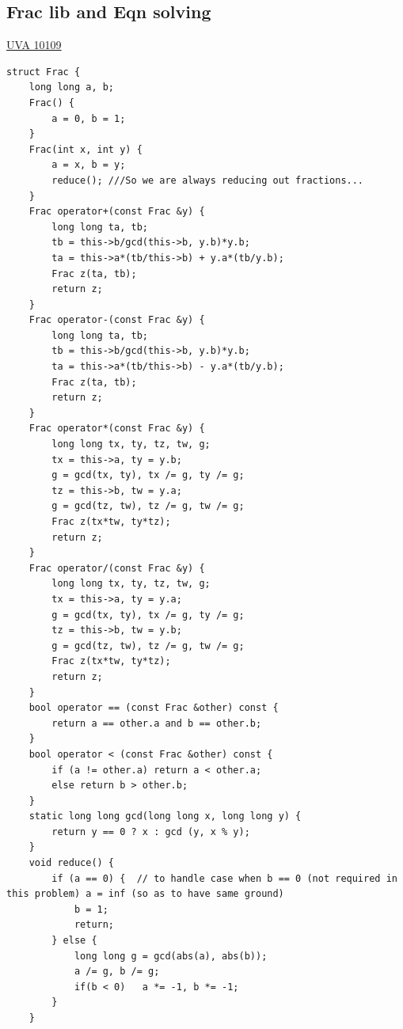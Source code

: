 \documentclass[8pt, a4paper, oneside, twocolumn]{extarticle}
\begin{document}
\subsection{Frac lib and Eqn solving}
\href{https://uva.onlinejudge.org/external/101/10109.pdf}{UVA 10109}
\begin{verbatim}
struct Frac {
    long long a, b;
    Frac() {
        a = 0, b = 1;
    }
    Frac(int x, int y) {
        a = x, b = y;
        reduce(); ///So we are always reducing out fractions...
    }
    Frac operator+(const Frac &y) {
        long long ta, tb;
        tb = this->b/gcd(this->b, y.b)*y.b;
        ta = this->a*(tb/this->b) + y.a*(tb/y.b);
        Frac z(ta, tb);
        return z;
    }
    Frac operator-(const Frac &y) {
        long long ta, tb;
        tb = this->b/gcd(this->b, y.b)*y.b;
        ta = this->a*(tb/this->b) - y.a*(tb/y.b);
        Frac z(ta, tb);
        return z;
    }
    Frac operator*(const Frac &y) {
        long long tx, ty, tz, tw, g;
        tx = this->a, ty = y.b;
        g = gcd(tx, ty), tx /= g, ty /= g;
        tz = this->b, tw = y.a;
        g = gcd(tz, tw), tz /= g, tw /= g;
        Frac z(tx*tw, ty*tz);
        return z;
    }
    Frac operator/(const Frac &y) {
        long long tx, ty, tz, tw, g;
        tx = this->a, ty = y.a;
        g = gcd(tx, ty), tx /= g, ty /= g;
        tz = this->b, tw = y.b;
        g = gcd(tz, tw), tz /= g, tw /= g;
        Frac z(tx*tw, ty*tz);
        return z;
    }
    bool operator == (const Frac &other) const {
        return a == other.a and b == other.b;
    }
    bool operator < (const Frac &other) const {
        if (a != other.a) return a < other.a;
        else return b > other.b;
    }
    static long long gcd(long long x, long long y) {
        return y == 0 ? x : gcd (y, x % y);
    }
    void reduce() {
        if (a == 0) {  // to handle case when b == 0 (not required in this problem) a = inf (so as to have same ground)
            b = 1;
            return;
        } else {
            long long g = gcd(abs(a), abs(b));
            a /= g, b /= g;
            if(b < 0)   a *= -1, b *= -1;
        }
    }


\end{verbatim}
\end{document}

